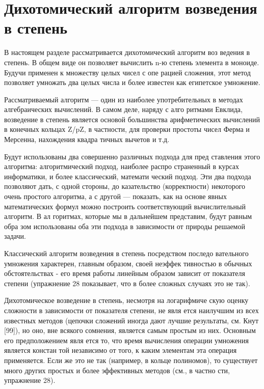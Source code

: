 \pagebreak
\section{Дихотомический алгоритм возведения в степень}
\noindent В настоящем разделе рассматривается дихотомический алгоритм воз­
ведения в степень. В общем виде он позволяет вычислить n-ю степень 
элемента в моноиде. Будучи применен к множеству целых чисел с опе­
рацией сложения, этот метод позволяет умножать два целых  числа и 
более известен как египетское умножение.

Рассматриваемый алгоритм — один из наиболее употребительных 
в  методах алгебраических вычислений.  В  самом деле,  наряду с  алго­
ритмами Евклида, возведение в степень является основой большинства 
арифметических  вычислений  в  конечных кольцах Z/pZ, в частности, 
для проверки простоты чисел Ферма и Мерсенна, нахождения квадра­
тичных вычетов и т.д.

Будут использованы два совершенно различных подхода для пред­
ставления этого алгоритма: алгоритмический подход, наиболее распро­
страненный  в курсах информатики,  и более классический,  математи­
ческий подход. Эти два подхода позволяют дать, с одной стороны, до­
казательство (корректности)  некоторого очень простого алгоритма, а 
с  другой  —  показать,  как  на основе явных математических  формул 
можно построить соответствующий вычислительный алгоритм. В ал­
горитмах, которые мы в дальнейшем представим, будут равным обра­
зом использованы оба эти подхода в зависимости от природы решаемой 
задачи.

Классический алгоритм возведения в степень посредством последо­
вательного умножения характерен,  главным образом, своей  неэффек­
тивностью в обычных обстоятельствах - его время работы линейным 
образом зависит  от  показателя  степени  (упражнение  28  показывает, 
что в более сложных случаях это не так).

Дихотомическое  возведение  в степень,  несмотря  на логарифмиче­
скую оценку сложности в зависимости от показателя степени, не явля­
ется наилучшим из всех известных методов (цепочки сложений иногда 
дают лучшие результаты, см. Кнут [99]), но оно, вне всякого сомнения, 
является самым простым из них. Основным его предположением явля­
ется то, что время вычисления операции умножения является констан­
той независимо от того, к каким элементам эта операция применяется. 
Если  же  это  не  так  (например,  в  кольце  полиномов),  то  существует 
много других простых и более эффективных  методов (см.,  в частно­
сти, упражнение 28).
